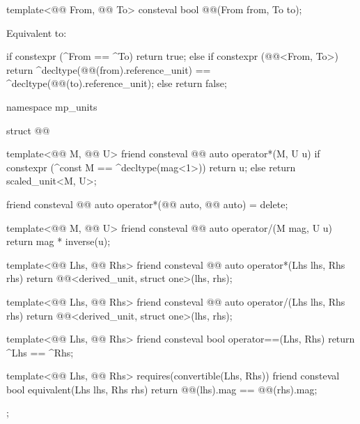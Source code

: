 \begin{itemdecl}
template<@@ From, @@ To>
consteval bool @@(From from, To to);
\end{itemdecl}

\begin{itemdescr}
\pnum
\effects
Equivalent to:
\begin{codeblock}
if constexpr (^From == ^To)
  return true;
else if constexpr (@@<From, To>)
  return ^decltype(@@(from).reference_unit) ==
         ^decltype(@@(to).reference_unit);
else
  return false;
\end{codeblock}
\end{itemdescr}

\begin{codeblock}
namespace mp_units {

struct @@ {
  template<@@ M, @@ U>
  friend consteval @@ auto operator*(M, U u)
  {
    if constexpr (^const M == ^decltype(mag<1>))
      return u;
    else
      return scaled_unit<M{}, U>{};
  }

  friend consteval @@ auto operator*(@@ auto, @@ auto) = delete;

  template<@@ M, @@ U>
  friend consteval @@ auto operator/(M mag, U u)
  {
    return mag * inverse(u);
  }

  template<@@ Lhs, @@ Rhs>
  friend consteval @@ auto operator*(Lhs lhs, Rhs rhs)
  {
    return @@<derived_unit, struct one>(lhs, rhs);
  }

  template<@@ Lhs, @@ Rhs>
  friend consteval @@ auto operator/(Lhs lhs, Rhs rhs)
  {
    return @@<derived_unit, struct one>(lhs, rhs);
  }

  template<@@ Lhs, @@ Rhs>
  friend consteval bool operator==(Lhs, Rhs)
  {
    return ^Lhs == ^Rhs;
  }

  template<@@ Lhs, @@ Rhs>
    requires(convertible(Lhs{}, Rhs{}))
  friend consteval bool equivalent(Lhs lhs, Rhs rhs)
  {
    return @@(lhs).mag == @@(rhs).mag;
  }
};

}
\end{codeblock}

